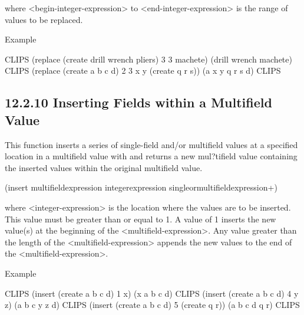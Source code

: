 \documentclass[letterpaper,10pt,english]{sphinxmanual}
\begin{document}
where \textless{}begin-integer-expression\textgreater{} to \textless{}end-integer-expression\textgreater{} is the
range of values to be replaced.

Example

\begin{sphinxVerbatim}[commandchars=\\\{\}]
CLIPS\PYGZgt{} (replace\PYGZdl{} (create\PYGZdl{} drill wrench pliers) 3 3 machete)
(drill wrench machete)
CLIPS\PYGZgt{} (replace\PYGZdl{} (create\PYGZdl{} a b c d) 2 3 x y (create\PYGZdl{} q r s))
(a x y q r s d)
CLIPS\PYGZgt{}
\end{sphinxVerbatim}


\subsection{12.2.10 Inserting Fields within a Multifield Value}
\label{\detokenize{actions:inserting-fields-within-a-multifield-value}}
This function inserts a series of single-field and/or multifield values
at a specified location in a multifield value with and returns a new
mul?tifield value containing the inserted values within the original
multifield value.


\begin{sphinxVerbatim}[commandchars=\\\{\}]
(insert\PYGZdl{} \PYGZlt{}multifield\PYGZhy{}expression\PYGZgt{}
  \PYGZlt{}integer\PYGZhy{}expression\PYGZgt{}
  \PYGZlt{}single\PYGZhy{}or\PYGZhy{}multi\PYGZhy{}field\PYGZhy{}expression\PYGZgt{}+)
\end{sphinxVerbatim}

where \textless{}integer-expression\textgreater{} is the location where the values are to be
inserted. This value must be greater than or equal to 1. A value of 1
inserts the new value(s) at the beginning of the
\textless{}multifield-expression\textgreater{}. Any value greater than the length of the
\textless{}multifield-expression\textgreater{} appends the new values to the end of the
\textless{}multifield-expression\textgreater{}.

Example

\begin{sphinxVerbatim}[commandchars=\\\{\}]
CLIPS\PYGZgt{} (insert\PYGZdl{} (create\PYGZdl{} a b c d) 1 x)
(x a b c d)
CLIPS\PYGZgt{} (insert\PYGZdl{} (create\PYGZdl{} a b c d) 4 y z)
(a b c y z d)
CLIPS\PYGZgt{} (insert\PYGZdl{} (create\PYGZdl{} a b c d) 5 (create\PYGZdl{} q r))
(a b c d q r)
CLIPS\PYGZgt{}
\end{sphinxVerbatim}
\end{document}
